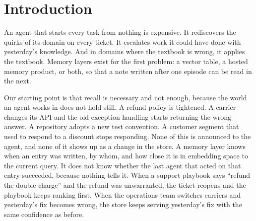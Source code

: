 \documentclass[11pt]{article}
\begin{document}
\begin{abstract}
traces and served with the same memory solves 0.94 and 0.92 of tasks on two of these scenarios,
under the rule change its teacher lived through, where the frontier agent on memory solves 0.84
and 0.82, at about one fortieth of the list price per solved task; it matches the frontier on
success under a change no training trace contains; and a model trained on its own traces
improves on its parent. We close with what this implies for how agent platforms should be
built, and with the three loops this makes up: outcomes improve the memory, failures become
tested and verified repairs to what the agent does, and the validated record becomes the model.
That arrangement, in which each loop's output is the next loop's input, is what we mean by
recursive self-improvement.
\end{abstract}

\section{Introduction}

An agent that starts every task from nothing is expensive. It rediscovers the quirks of its
domain on every ticket. It escalates work it could have done with yesterday's knowledge. And
in domains where the textbook is wrong, it applies the textbook. Memory layers exist for the
first problem: a vector table, a hosted memory product, or both, so that a note written after
one episode can be read in the next.

Our starting point is that recall is necessary and not enough, because the world an agent
works in does not hold still. A refund policy is tightened. A carrier changes its API and the
old exception handling starts returning the wrong answer. A repository adopts a new test
convention. A customer segment that used to respond to a discount stops responding. None of
this is announced to the agent, and none of it shows up as a change in the store. A memory
layer knows when an entry was written, by whom, and how close it is in embedding space to the
current query. It does not know whether the last agent that acted on that entry succeeded,
because nothing tells it. When a support playbook says ``refund the double charge'' and the
refund was unwarranted, the ticket reopens and the playbook keeps ranking first. When the
operations team switches carriers and yesterday's fix becomes wrong, the store keeps serving
yesterday's fix with the same confidence as before.
\end{document}
